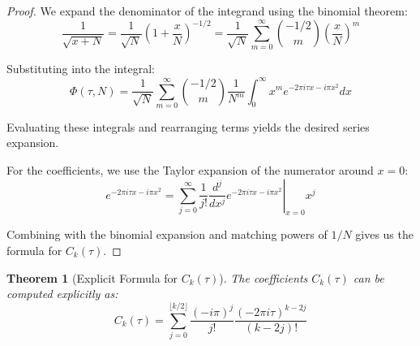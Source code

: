 \documentclass{article}
\newtheorem{theorem}{Theorem}
\begin{document}
\begin{proof}
We expand the denominator of the integrand using the binomial theorem:
\[
\frac{1}{\sqrt{x+N}} = \frac{1}{\sqrt{N}}\left(1 + \frac{x}{N}\right)^{-1/2} = \frac{1}{\sqrt{N}}\sum_{m=0}^{\infty}\binom{-1/2}{m}\left(\frac{x}{N}\right)^m
\]

Substituting into the integral:
\[
\Phi(\tau, N) = \frac{1}{\sqrt{N}}\sum_{m=0}^{\infty}\binom{-1/2}{m}\frac{1}{N^m}\int_0^{\infty}x^m e^{-2\pi i\tau x - i\pi x^2}dx
\]

Evaluating these integrals and rearranging terms yields the desired series expansion.

For the coefficients, we use the Taylor expansion of the numerator around $x=0$:
\[
e^{-2\pi i\tau x - i\pi x^2} = \sum_{j=0}^{\infty}\frac{1}{j!}\left.\frac{d^j}{dx^j}e^{-2\pi i\tau x - i\pi x^2}\right|_{x=0}x^j
\]

Combining with the binomial expansion and matching powers of $1/N$ gives us the formula for $C_k(\tau)$.
\end{proof}

\begin{theorem}[Explicit Formula for $C_k(\tau)$]
The coefficients $C_k(\tau)$ can be computed explicitly as:
\[
C_k(\tau) = \sum_{j=0}^{\lfloor k/2 \rfloor}\frac{(-i\pi)^j}{j!}\frac{(-2\pi i\tau)^{k-2j}}{(k-2j)!}
\]
\end{theorem}
\end{document}
